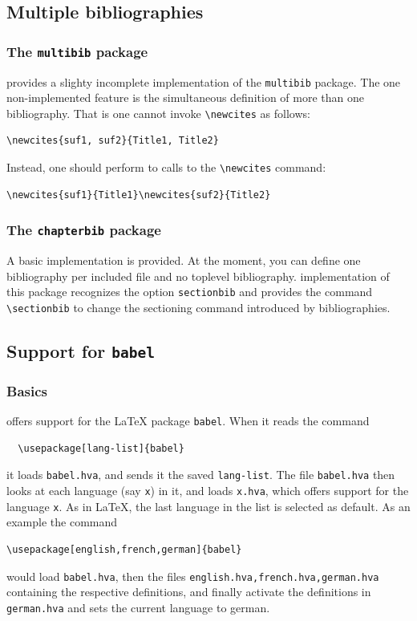 \subsection{Multiple bibliographies}

\subsubsection*{The \texttt{multibib} package}
\hevea{} provides a slighty incomplete implementation of the
\texttt{multibib} package. The one non-implemented feature is the
simultaneous definition of more than one bibliography.
That is one cannot invoke \verb+\newcites+ as follows:
\begin{verbatim}
\newcites{suf1, suf2}{Title1, Title2}
\end{verbatim}
Instead, one should perform to calls to the \verb+\newcites+ command:
\begin{verbatim}
\newcites{suf1}{Title1}\newcites{suf2}{Title2}
\end{verbatim}


\subsubsection*{The \texttt{chapterbib} package}
A basic implementation is provided. At the moment, you can
define one bibliography per included file and no toplevel
bibliography.
\hevea{} implementation of this package recognizes the option
\verb+sectionbib+ and provides the command \verb+\sectionbib+
to change the sectioning command introduced by bibliographies.


\subsection{Support for \texttt{babel}}
\subsubsection{Basics}
\hevea{} offers support for the \LaTeX{} package {\tt babel}. When it reads the command
\begin{verbatim}
  \usepackage[lang-list]{babel}
\end{verbatim}
it loads {\tt babel.hva}, and sends it the saved {\tt lang-list}. The
file {\tt babel.hva} then looks at each language (say {\tt{}x}) in it, and loads {\tt x.hva}, which offers support for the language {\tt x}. As in \LaTeX, the last language in the list is selected as default. As an example the command
\begin{verbatim}
\usepackage[english,french,german]{babel}
\end{verbatim}
would load {\tt babel.hva}, then the files {\tt english.hva,french.hva,german.hva} containing the respective definitions, and finally activate the definitions in {\tt german.hva} and sets the current language to german.

